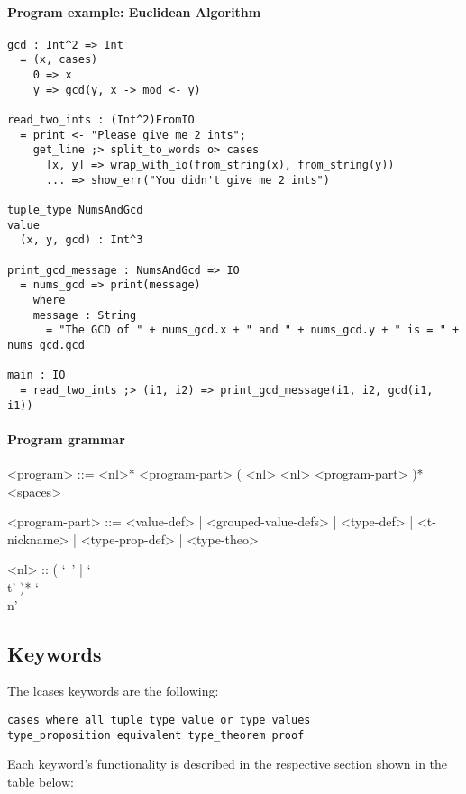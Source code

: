\documentclass{article}
\begin{document}
\paragraph{Program example: Euclidean Algorithm}
\begin{verbatim}
gcd : Int^2 => Int
  = (x, cases)
    0 => x
    y => gcd(y, x -> mod <- y) 

read_two_ints : (Int^2)FromIO
  = print <- "Please give me 2 ints";
    get_line ;> split_to_words o> cases
      [x, y] => wrap_with_io(from_string(x), from_string(y))
      ... => show_err("You didn't give me 2 ints")

tuple_type NumsAndGcd
value
  (x, y, gcd) : Int^3

print_gcd_message : NumsAndGcd => IO
  = nums_gcd => print(message)
    where
    message : String
      = "The GCD of " + nums_gcd.x + " and " + nums_gcd.y + " is = " + nums_gcd.gcd

main : IO
  = read_two_ints ;> (i1, i2) => print_gcd_message(i1, i2, gcd(i1, i1))
\end{verbatim}

\paragraph{Program grammar}
\begin{grammar}
<program> ::=
<nl>* <program-part> ( <nl> <nl> <program-part> )* <spaces>

<program-part> ::=
<value-def> | <grouped-value-defs> | <type-def> | <t-nickname> | <type-prop-def> |
<type-theo>

<nl> :: ( `\ ' | `\\t' )* `\\n'
\end{grammar}

\subsection{Keywords}

The lcases keywords are the following:
\begin{verbatim}
cases where all tuple_type value or_type values
type_proposition equivalent type_theorem proof
\end{verbatim}
Each keyword's functionality is described in the respective section shown in the 
table below:
\end{document}
